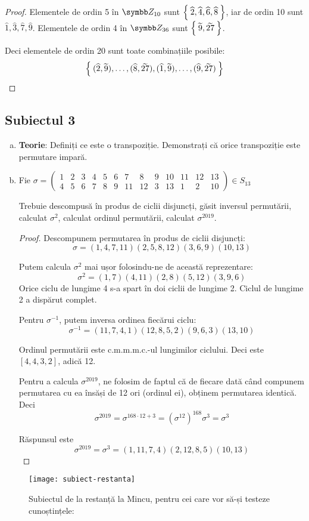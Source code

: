 \begin{enumerate}[(a)]
\begin{proof}
    Elementele de ordin 5 în \(\integersmod{10}\) sunt \(\Set{ \widehat{2}, \widehat{4}, \widehat{6}, \widehat{8} }\), iar de ordin 10 sunt \(\widehat{1}, \widehat{3}, \widehat{7}, \widehat{9}\). Elementele de ordin 4 în \(\integersmod{36}\) sunt \(\Set{ \widetilde{9}, \widetilde{27} }\).

    Deci elementele de ordin 20 sunt toate combinațiile posibile:
    \[
    \Set{ (\widehat{2}, \widetilde{9}), \dots, (\widehat{8}, \widetilde{27}), (\widehat{1}, \widetilde{9}), \dots, (\widehat{9}, \widetilde{27}) }
    \]
    \end{proof}
\end{enumerate}

\subsection*{Subiectul 3}
\begin{enumerate}[(a)]
    \item \textbf{Teorie}: Definiți ce este o transpoziție. Demonstrați că orice transpoziție este permutare impară.

    \item Fie
    \(
    \sigma = \left(\begin{smallmatrix}
    1 & 2 & 3 & 4 & 5 & 6 & 7 & 8 & 9 & 10 & 11 & 12 & 13 \\
    4 & 5 & 6 & 7 & 8 & 9 & 11 & 12 & 3 & 13 & 1 & 2 & 10
    \end{smallmatrix}\right) \in S_{13}
    \)

    Trebuie descompusă în produs de ciclii disjuncți, găsit inversul permutării, calculat \(\sigma^2\), calculat ordinul permutării, calculat \(\sigma^{2019}\).
    \begin{proof}
    Descompunem permutarea în produs de ciclii disjuncți:
    \[
        \sigma = (1, 4, 7, 11) (2, 5, 8, 12) (3, 6, 9) (10, 13)
    \]

    Putem calcula \(\sigma^2\) mai ușor folosindu-ne de această reprezentare:
    \[
        \sigma^2 = (1, 7) (4, 11) (2, 8) (5, 12) (3, 9, 6)
    \]
    Orice ciclu de lungime 4 s-a spart în doi ciclii de lungime 2. Ciclul de lungime 2 a dispărut complet.

    Pentru \(\sigma^{-1}\), putem inversa ordinea fiecărui ciclu:
    \[
        \sigma^{-1} = (11, 7, 4, 1) (12, 8, 5, 2) (9, 6, 3) (13, 10)
    \]

    Ordinul permutării este c.m.m.m.c.-ul lungimilor ciclului. Deci este \([4, 4, 3, 2]\), adică 12.

    Pentru a calcula \(\sigma^{2019}\), ne folosim de faptul că de fiecare dată când compunem permutarea cu ea însăși de 12 ori (ordinul ei), obținem permutarea identică. Deci
    \[
        \sigma^{2019} = \sigma^{168 \cdot 12 + 3} = {(\sigma^{12})}^{168} \sigma^3 = \sigma^3
    \]

    Răspunsul este
    \[
        \sigma^{2019} = \sigma^3 = (1, 11, 7, 4)(2, 12, 8, 5)(10, 13)
    \]
    \end{proof}
\end{enumerate}


\begin{figure}[ht]
    \caption*{Subiectul de la restanță la Mincu, pentru cei care vor să-și testeze cunoștințele:}
    \texttt{[image: subiect-restanta]}
    \centering
\end{figure}
